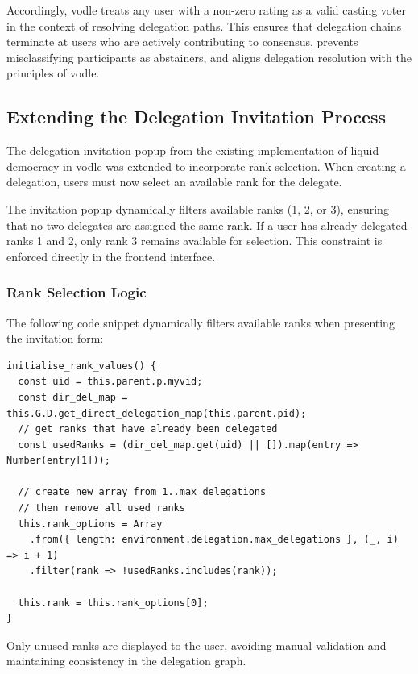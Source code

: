 Accordingly, vodle treats any user with a non-zero rating as a valid casting voter in the context of resolving delegation paths. This ensures that delegation chains terminate at users who are actively contributing to consensus, prevents misclassifying participants as abstainers, and aligns delegation resolution with the principles of vodle. 

\subsection{Extending the Delegation Invitation Process}

The delegation invitation popup from the existing implementation of liquid democracy in vodle was extended to incorporate rank selection. When creating a delegation, users must now select an available rank for the delegate.

The invitation popup dynamically filters available ranks (1, 2, or 3), ensuring that no two delegates are assigned the same rank. If a user has already delegated ranks 1 and 2, only rank 3 remains available for selection. This constraint is enforced directly in the frontend interface.

\subsubsection{Rank Selection Logic}

The following code snippet dynamically filters available ranks when presenting the invitation form:

\begin{verbatim}
initialise_rank_values() {
  const uid = this.parent.p.myvid;
  const dir_del_map = this.G.D.get_direct_delegation_map(this.parent.pid);
  // get ranks that have already been delegated
  const usedRanks = (dir_del_map.get(uid) || []).map(entry => Number(entry[1]));

  // create new array from 1..max_delegations
  // then remove all used ranks
  this.rank_options = Array
    .from({ length: environment.delegation.max_delegations }, (_, i) => i + 1)
    .filter(rank => !usedRanks.includes(rank));

  this.rank = this.rank_options[0];
}
\end{verbatim}

Only unused ranks are displayed to the user, avoiding manual validation and maintaining consistency in the delegation graph.

